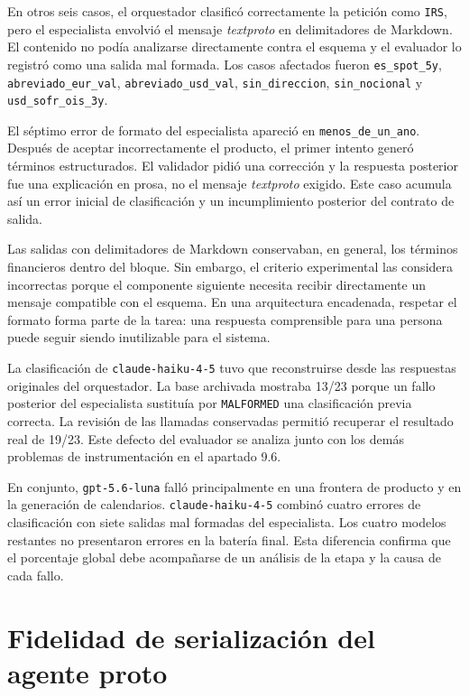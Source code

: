 En otros seis casos, el orquestador clasificó correctamente la petición como \texttt{IRS}, pero el especialista envolvió el mensaje \textit{textproto} en delimitadores de Markdown. El contenido no podía analizarse directamente contra el esquema y el evaluador lo registró como una salida mal formada. Los casos afectados fueron \texttt{es\_spot\_5y}, \texttt{abreviado\_eur\_val}, \texttt{abreviado\_usd\_val}, \texttt{sin\_direccion}, \texttt{sin\_nocional} y \texttt{usd\_sofr\_ois\_3y}.

El séptimo error de formato del especialista apareció en \texttt{menos\_de\_un\_ano}. Después de aceptar incorrectamente el producto, el primer intento generó términos estructurados. El validador pidió una corrección y la respuesta posterior fue una explicación en prosa, no el mensaje \textit{textproto} exigido. Este caso acumula así un error inicial de clasificación y un incumplimiento posterior del contrato de salida.

Las salidas con delimitadores de Markdown conservaban, en general, los términos financieros dentro del bloque. Sin embargo, el criterio experimental las considera incorrectas porque el componente siguiente necesita recibir directamente un mensaje compatible con el esquema. En una arquitectura encadenada, respetar el formato forma parte de la tarea: una respuesta comprensible para una persona puede seguir siendo inutilizable para el sistema.

La clasificación de \texttt{claude-haiku-4-5} tuvo que reconstruirse desde las respuestas originales del orquestador. La base archivada mostraba 13/23 porque un fallo posterior del especialista sustituía por \texttt{MALFORMED} una clasificación previa correcta. La revisión de las llamadas conservadas permitió recuperar el resultado real de 19/23. Este defecto del evaluador se analiza junto con los demás problemas de instrumentación en el apartado 9.6.

En conjunto, \texttt{gpt-5.6-luna} falló principalmente en una frontera de producto y en la generación de calendarios. \texttt{claude-haiku-4-5} combinó cuatro errores de clasificación con siete salidas mal formadas del especialista. Los cuatro modelos restantes no presentaron errores en la batería final. Esta diferencia confirma que el porcentaje global debe acompañarse de un análisis de la etapa y la causa de cada fallo.


\section{Fidelidad de serialización del agente proto}
\label{sec:fidelidad_proto}

